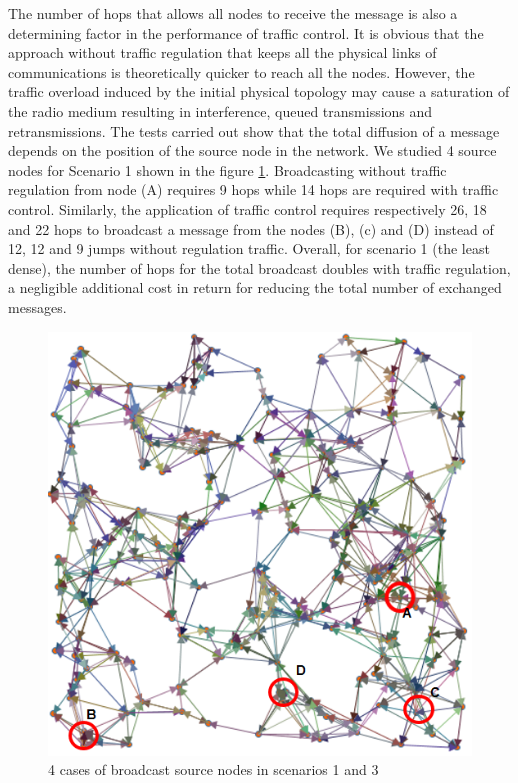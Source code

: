 \documentclass[letterpaper, 10 pt, conference]{ieeeconf}
\begin{document}
The number of hops that allows all nodes to receive the message is also a determining factor in the performance of traffic control. It is obvious that the approach without traffic regulation that keeps all the physical links of communications is theoretically quicker  to reach all the nodes. However, the traffic overload induced by the initial physical topology may cause a saturation of the radio medium resulting in interference, queued transmissions and retransmissions. The tests carried out show that the total diffusion of a message depends on the position of the source node in the network. We studied 4 source nodes for Scenario 1 shown in the figure \ref{broadcast}. Broadcasting without traffic regulation from node (A) requires 9 hops while 14 hops are required with traffic control. Similarly, the application of traffic control requires respectively 26, 18 and 22 hops to broadcast a message from the nodes (B), (c) and (D) instead of 12, 12 and 9 jumps without regulation traffic. Overall, for scenario 1 (the least dense), the number of hops for the total broadcast doubles with traffic regulation, a negligible additional cost in return for reducing the total number of exchanged messages.


\begin{figure}[h]
\centering
\includegraphics[width=\columnwidth]{broadcast.png}
\caption{4 cases of broadcast source nodes in scenarios 1 and 3}
\label{broadcast}
\end{figure}
\end{document}
